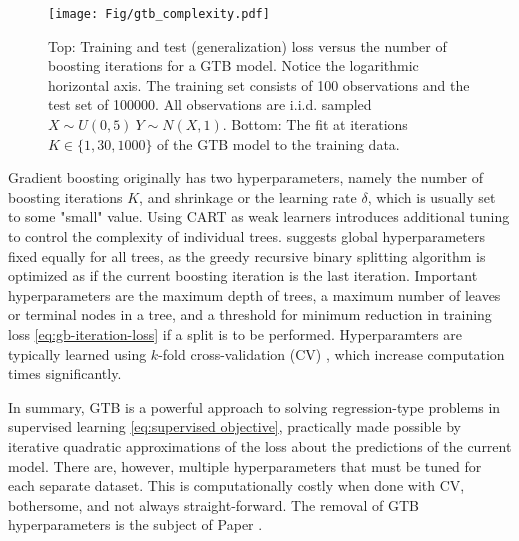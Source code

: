 \begin{figure}[t!]
	\centering
	\texttt{[image: Fig/gtb\_complexity.pdf]}
	\caption{
		\label{fig:gtb-complexity}
		Top: Training and test (generalization) loss versus the number of boosting iterations for a 
		GTB model. 
		Notice the logarithmic horizontal axis.
		The training set consists of 100 observations and the test set of 100000. All observations are i.i.d. sampled $X\sim U(0,5)~Y\sim N(X,1)$.
		Bottom: The fit at iterations $K\in\{1,30,1000\}$ of the GTB model to the training data.
	}
\end{figure}
Gradient boosting originally has two hyperparameters, namely the number of boosting iterations $K$, and shrinkage or the learning rate $\delta$, which is usually set to some "small" value.
Using CART as weak learners introduces additional tuning to control the complexity of individual trees.
\citet{friedman2000additive} suggests global hyperparameters fixed equally for all trees, as the greedy recursive binary splitting algorithm is optimized as if the current boosting iteration is the last iteration.
Important hyperparameters are the maximum depth of trees, a maximum number of leaves or terminal nodes in a tree, and a threshold for minimum reduction in training loss \eqref{eq:gb-iteration-loss} if a split is to be performed.
Hyperparamters are typically learned using $k$-fold cross-validation (CV) \citep{stone1974cross}, which increase computation times significantly.

In summary, GTB is a powerful approach to solving regression-type problems in supervised learning \eqref{eq:supervised objective}, practically made possible by iterative quadratic
approximations of the loss about the predictions of the current model.
There are, however, multiple hyperparameters that must be tuned for each separate dataset.
This is computationally costly when done with CV, bothersome, and not always straight-forward.
The removal of GTB hyperparameters is the subject of Paper .






